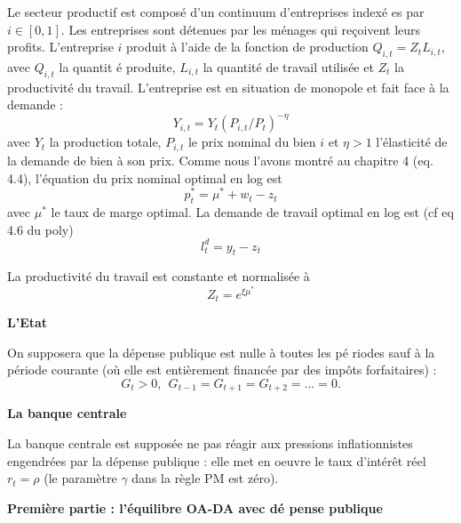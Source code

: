 \documentclass[a4paper,11pt]{article}
\begin{document}
Le secteur productif est compos\'{e} d'un continuum d'entreprises index\'{e}%
es par $i\in \left[ 0,1\right] $. Les entreprises sont détenues par les ménages qui reçoivent leurs profits. L'entreprise $i$ produit \`{a} l'aide de
la fonction de production $Q_{i,t}=Z_{t}L_{i,t}$, avec $Q_{i,t}$ la quantit%
\'{e} produite, $L_{i,t}$ la quantit\'{e} de travail utilis\'{e}e et $Z_{t}$
la productivit\'{e} du travail. L'entreprise est en situation de monopole et
fait face \`{a} la demande :%
\begin{equation*}
Y_{i,t}=Y_{t}\left( P_{i,t}/P_{t}\right) ^{-\eta }
\end{equation*}%
avec $Y_{t}$ la production totale, $P_{i,t}$ le prix nominal du bien $i$ et $%
\eta >1$ l'\'{e}lasticit\'{e} de la demande de bien \`{a} son prix. Comme nous l'avons montr\'{e} au chapitre 4 (eq. 4.4), l'\'{e}quation du prix nominal optimal en log est 
\begin{equation*}
p^{\ast}_{t}=\mu^{\ast} +w_t-z_t
\end{equation*}%
avec $\mu^{\ast}$ le taux de marge optimal. La demande de travail optimal en log est (cf eq 4.6 du poly)
\begin{equation*}
l_{t}^{d}=y_{t}-z_{t}
\end{equation*} 

La productivit\'{e} du travail est constante et normalis\'{e}e \`{a} 
\begin{equation*}
Z_{t}=e^{\xi \mu^{\ast}}
\end{equation*}


\noindent \textbf{L'Etat}

On supposera que la d\'{e}pense publique est nulle \`{a} toutes les p\'{e}%
riodes sauf \`{a} la p\'{e}riode courante (o\`{u} elle est enti\`{e}rement
financ\'{e}e par des imp\^{o}ts forfaitaires) :%
\begin{equation*}
G_{t}>0,\ \ G_{t-1}=G_{t+1}=G_{t+2}=...=0.
\end{equation*}

\noindent \textbf{La banque centrale}

La banque centrale est suppos\'{e}e ne pas r\'{e}agir aux pressions
inflationnistes engendr\'{e}es par la d\'{e}pense publique : elle met en
oeuvre le taux d'int\'{e}r\^{e}t r\'{e}el $r_{t}=\rho $ (le param\`{e}tre $\gamma$ dans la r\`{e}gle PM est z\'{e}ro).

\bigskip

\noindent \textbf{Premi\`{e}re partie : l'\'{e}quilibre OA-DA avec d\'{e}%
pense publique}
\end{document}
